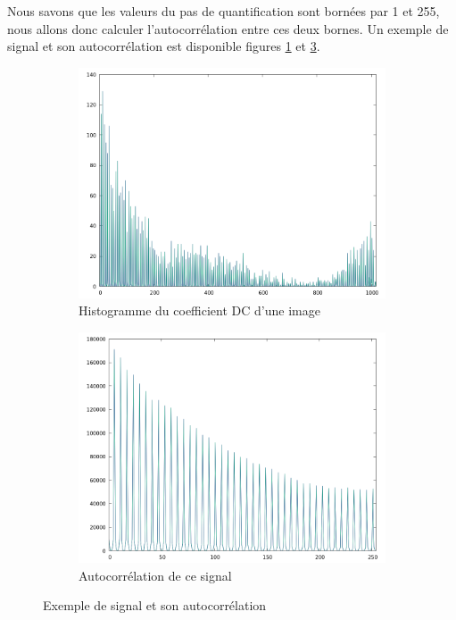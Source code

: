 \documentclass[utf8,final]{stageM2R} %
\begin{document}
Nous savons que les valeurs du pas de quantification sont bornées par 1 et 255, nous allons donc calculer l'autocorrélation entre ces deux bornes. Un exemple de signal et son autocorrélation est disponible figures \ref{fig:signal} et \ref{fig:autocorrel}.

\begin{figure}
  \begin{subfigure}{.5\textwidth}
    \centering
    \includegraphics[width=\linewidth]{images/signal}
    \caption{Histogramme du coefficient DC d'une image}
    \label{fig:signal}
  \end{subfigure}
  \begin{subfigure}{.5\textwidth}
    \centering
    \includegraphics[width=\linewidth]{images/autocorrelation}
    \caption{Autocorrélation de ce signal}
    \label{fig:autocorrel}
  \end{subfigure}
  \caption{Exemple de signal et son autocorrélation}
\end{figure}
\end{document}
